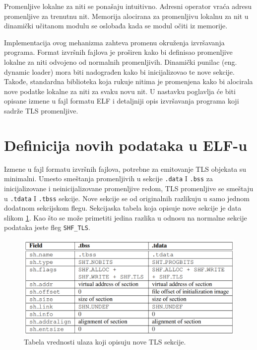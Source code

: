 \documentclass[12pt,oneside]{memoir}
\begin{document}
Promenljive lokalne za niti se ponašaju intuitivno. Adresni operator vraća adresu promenljive za trenutnu nit. Memorija alocirana za promenljivu lokalnu za nit u dinamički učitanom modulu se oslobađa kada se modul očiti iz memorije.

Implementacija ovog mehanizma zahteva promenu okruženja izvršavanja programa. Format izvršnih fajlova je proširen kako bi definisao promenljive lokalne za niti odvojeno od normalnih promenljivih. Dinamički punilac (eng. dynamic loader) mora biti nadograđen kako bi inicijalizovao te nove sekcije. Takođe, standardna biblioteka koja rukuje nitima je promenjena kako bi alocirala nove podatke lokalne za niti za svaku novu nit. U nastavku poglavlja će biti opisane izmene u fajl formatu ELF i detaljniji opis izvršavanja programa koji sadrže TLS promenljive.

\section{Definicija novih podataka u ELF-u}

Izmene u fajl formatu izvršnih fajlova, potrebne za emitovanje TLS objekata su minimalni. Umesto smeštanja promenljivih u sekcije \texttt{.data} I \texttt{.bss} za inicijalizovane i neinicijalizovane promenljive redom, TLS promenljive se smeštaju u \texttt{.tdata} I \texttt{.tbss} sekcije. Nove sekcije se od originalnih razlikuju u samo jednom dodatnom sekcijskom flegu. Sekcijaska tabela koja opisuje nove sekcije je data slikom \ref{fig:tls_secs}. Kao što se može primetiti jedina razlika u odnosu na normalne sekcije podataka jeste fleg \texttt{SHF\_TLS}.

\begin{figure}[h!]
	\begin{center}
		\includegraphics[scale=0.6]{slike/tabela1elfTLS.png}
	\end{center}
	\caption{Tabela vrednosti ulaza koji opisuju nove TLS sekcije.}
	\label{fig:tls_secs}
\end{figure}
\end{document}
